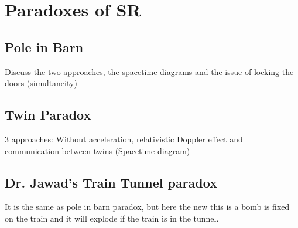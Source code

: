 
\section{Paradoxes of SR}

\subsection{Pole in Barn}
Discuss the two approaches, the spacetime diagrams and the issue of locking the doors (simultaneity)

\subsection{Twin Paradox}
3 approaches: Without acceleration, relativistic Doppler effect and communication between twins (Spacetime diagram)

\subsection{Dr. Jawad's Train Tunnel paradox}
It is the same as pole in barn paradox, but here the new this is a bomb is fixed on the train and it will explode if the train is in the tunnel. 